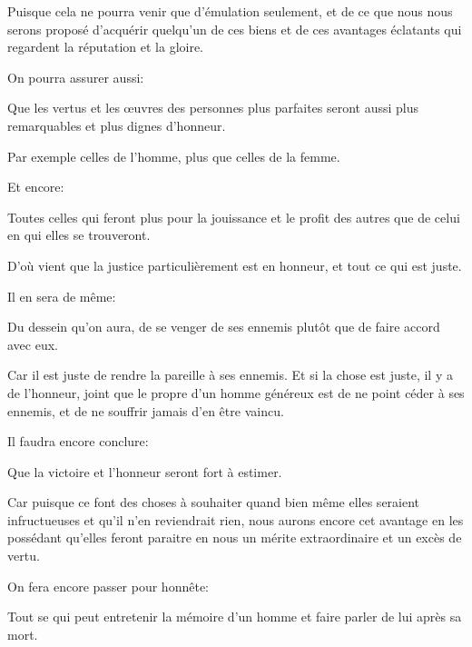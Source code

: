 Puisque cela ne pourra venir que d'émulation seulement, et de ce que nous nous serons proposé d'acquérir quelqu'un
de ces biens et de ces avantages éclatants qui regardent la réputation et la gloire. 

\bigbreak

On pourra assurer aussi:

\begin{lieu}
	Que les vertus et les œuvres des personnes plus parfaites seront aussi plus remarquables et plus dignes d'honneur.
\end{lieu}

Par exemple celles de l'homme, plus que celles de la femme. 

\bigbreak

Et encore:

\begin{lieu}
	Toutes celles qui feront plus pour la jouissance et le profit des autres que de celui en qui elles se trouveront.
\end{lieu}

D'où vient que la justice particulièrement est en honneur, et tout ce qui est juste.

\bigbreak

Il en sera de même:

\begin{lieu}
	Du dessein qu'on aura, de se venger de ses ennemis plutôt que de faire accord avec eux.
\end{lieu}

Car il est juste de rendre la pareille à ses ennemis. Et si la chose est juste, il y a de l'honneur, joint que le
propre d'un homme généreux est de ne point céder à ses ennemis, et de ne souffrir jamais d'en être vaincu.

\bigbreak

Il faudra encore conclure:

\begin{lieu}
	Que la victoire et l'honneur seront fort à estimer.
\end{lieu}

Car puisque ce font des choses à souhaiter quand bien même elles seraient infructueuses et qu'il n'en reviendrait
rien, nous aurons encore cet avantage en les possédant qu'elles feront paraitre en nous un mérite extraordinaire
et un excès de vertu. 

\bigbreak

On fera encore passer pour honnête:

\begin{lieu}
	Tout se qui peut entretenir la mémoire d'un homme et faire parler de lui après sa mort.
\end{lieu}

